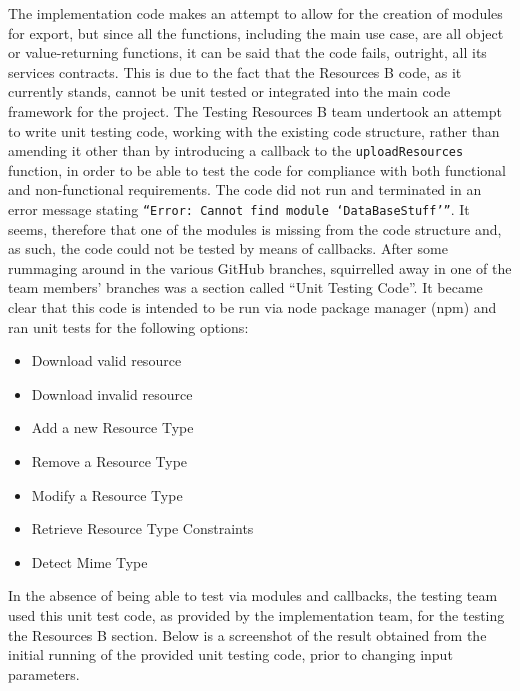 \documentclass[a4paper]{article}
\begin{document}


The implementation code makes an attempt to allow for the creation of modules for export, but since all the functions, including the main use case, are all object or value-returning functions, it can be said that the code fails, outright, all its services contracts. This is due to the fact that the Resources B code, as it currently stands, cannot be unit tested or integrated into the main code framework for the project. 
The Testing Resources B team undertook an attempt to write unit testing code, working with the existing code structure, rather than amending it other than by introducing a callback to the \texttt{uploadResources} function, in order to be able to test the code for compliance with both functional and non-functional requirements. The code did not run and terminated in an error message stating \texttt{“Error: Cannot find module ‘DataBaseStuff’”}. It seems, therefore that one of the modules is missing from the code structure and, as such, the code could not be tested by means of callbacks.
After some rummaging around in the various GitHub branches, squirrelled away in one of the team members’ branches was a section called “Unit Testing Code”. It became clear that this code is intended to be run via node package manager (npm) and ran unit tests for the following options: 
\begin{itemize}
\item	Download valid resource
\item	Download invalid resource
\item	Add a new Resource Type
\item	Remove a Resource Type
\item	Modify a Resource Type
\item	Retrieve Resource Type Constraints
\item	Detect Mime Type
\end{itemize}
In the absence of being able to test via modules and callbacks, the testing team used this unit test code, as provided by the implementation team, for the testing the Resources B section. Below is a screenshot of the result obtained from the initial running of the provided unit testing code, prior to changing input parameters.
\end{document}
